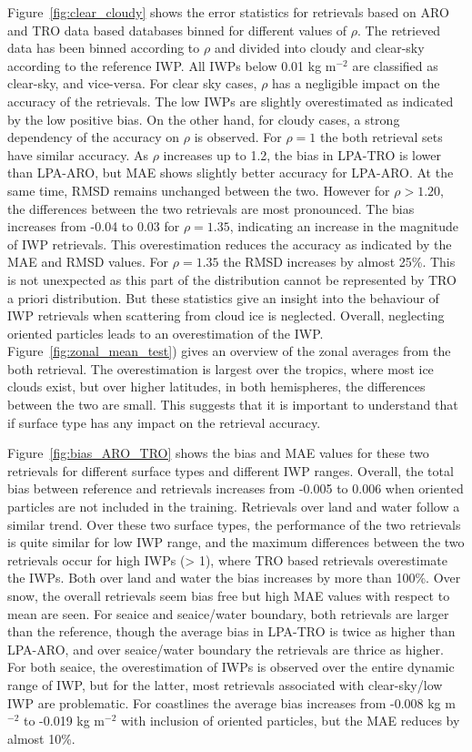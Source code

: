 \documentclass[amt, manuscript]{copernicus}
\begin{document}
Figure~\ref{fig:clear_cloudy} shows the error statistics for retrievals based on ARO and TRO data based databases binned for different values of $\rho$. The retrieved data has been binned according to $\rho$ and divided into cloudy and clear-sky according to the reference IWP. All IWPs below 0.01\,\,kg m$^{-2}$ are classified as clear-sky, and vice-versa. For clear sky cases, $\rho$ has a negligible impact on the accuracy of the retrievals. The low IWPs are slightly overestimated as indicated by the low positive bias. On the other hand, for cloudy cases, a strong dependency of the accuracy on $\rho$ is observed. For $\rho = 1$ the both retrieval sets have similar accuracy. As $\rho$ increases up to 1.2, the bias in LPA-TRO is lower than LPA-ARO, but MAE shows slightly better accuracy for LPA-ARO. At the same time, RMSD remains unchanged between the two. However for $\rho > 1.20$, the differences between the two retrievals are most pronounced. The bias increases from -0.04 to 0.03 for $\rho = 1.35$, indicating an increase in the magnitude of IWP retrievals. This overestimation reduces the accuracy as indicated by the MAE and RMSD values. For $\rho = 1.35$ the RMSD increases by almost 25\%. This is not unexpected as this part of the distribution cannot be represented by TRO a priori distribution. But these statistics give an insight into the behaviour of IWP retrievals when scattering from cloud ice is neglected. Overall, neglecting oriented particles leads to an overestimation of the IWP. Figure~\ref{fig:zonal_mean_test}) gives an overview of the zonal averages from the both retrieval. The overestimation is largest over the tropics, where most ice clouds exist, but over higher latitudes, in both hemispheres, the differences between the two are small. This suggests that it is important to understand that if surface type has any impact on the retrieval accuracy. 

Figure~\ref{fig:bias_ARO_TRO} shows the bias and MAE values for these two retrievals for different surface types and different IWP ranges. Overall, the total bias between reference and retrievals increases from -0.005 to 0.006 when oriented particles are not included in the training.
Retrievals over land and water follow a similar trend. Over these two surface types, the performance of the two retrievals is quite similar for low IWP range, and the maximum differences between the two retrievals occur for high IWPs (> 1), where TRO based retrievals overestimate the IWPs. Both over land and water the bias increases by more than 100\%. Over snow, the overall retrievals seem bias free but high MAE values with respect to mean are seen. For seaice and seaice/water boundary, both retrievals are larger than the reference, though the average bias in LPA-TRO is twice as higher than LPA-ARO, and over seaice/water boundary the retrievals are thrice as higher. For both seaice, the overestimation of IWPs is observed over the entire dynamic range of IWP, but for the latter, most retrievals associated with clear-sky/low IWP are problematic. For coastlines the average bias increases from  -0.008\,\,kg m$^{-2}$ to -0.019\,\,kg m$^{-2}$ with inclusion of oriented particles, but the MAE reduces by almost 10\%.  
\end{document}
